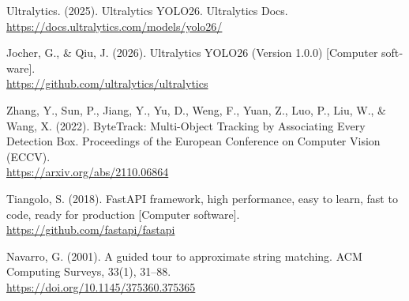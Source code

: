 \begin{enumerate}[leftmargin=*]

  \begin{english}

  \item Ultralytics. (2025). Ultralytics YOLO26. Ultralytics Docs. \\
    \href{https://docs.ultralytics.com/models/yolo26/}{https://docs.ultralytics.com/models/yolo26/}

  \item Jocher, G., \& Qiu, J. (2026). Ultralytics YOLO26
    (Version 1.0.0) [Computer software]. \\
    \href{https://github.com/ultralytics/ultralytics}{https://github.com/ultralytics/ultralytics}

  \item Zhang, Y., Sun, P., Jiang, Y., Yu, D., Weng, F.,
    Yuan, Z., Luo, P., Liu, W., \& Wang, X. (2022).
    ByteTrack: Multi-Object Tracking by Associating Every Detection Box.
    Proceedings of the European Conference on Computer Vision (ECCV). \\
    \href{https://arxiv.org/abs/2110.06864}{https://arxiv.org/abs/2110.06864}

  \item Tiangolo, S. (2018). FastAPI framework, high performance,
    easy to learn, fast to code, ready for production [Computer software]. \\
    \href{https://github.com/fastapi/fastapi}{https://github.com/fastapi/fastapi}

  \item Navarro, G. (2001). A guided tour to approximate string matching.
    ACM Computing Surveys, 33(1), 31--88. \\
    \href{https://doi.org/10.1145/375360.375365}{https://doi.org/10.1145/375360.375365}

  \end{english}

\end{enumerate}
